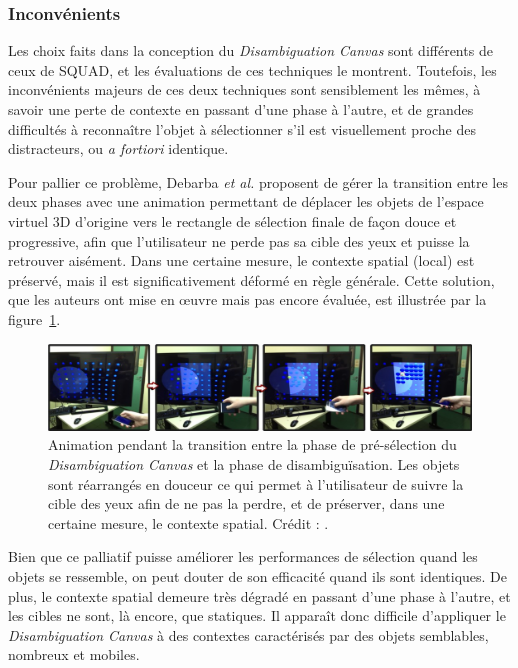 	\subsubsection{Inconvénients}
	Les choix faits dans la conception du \emph{Disambiguation Canvas} sont différents de ceux de SQUAD, et les évaluations de ces techniques le montrent. Toutefois, les inconvénients majeurs de ces deux techniques sont sensiblement les mêmes, à savoir une perte de contexte en passant d'une phase à l'autre, et de grandes difficultés à reconnaître l'objet à sélectionner s'il est visuellement proche des distracteurs, ou \emph{a fortiori} identique.
	
	Pour pallier ce problème, Debarba \emph{et al.} proposent de gérer la transition entre les deux phases avec une animation permettant de déplacer les objets de l'espace virtuel 3D d'origine vers le rectangle de sélection finale de façon \og douce \fg{} et progressive, afin que l'utilisateur ne perde pas sa cible des yeux et puisse la retrouver aisément. Dans une certaine mesure, le contexte spatial (local) est préservé, mais il est significativement déformé en règle générale. Cette solution, que les auteurs ont mise en \oe{}uvre mais pas encore évaluée, est illustrée par la figure~\ref{fig:dCanvasContext}.
	
	\begin{figure}[!htb]
		\centering
		\includegraphics[width=\textwidth]{figures/ch2/dCanvasContext}
		\caption[\emph{Disambiguation Canvas} -- animation de transition]{Animation pendant la transition entre la phase de pré-sélection du \emph{Disambiguation Canvas} et la phase de disambiguïsation. Les objets sont réarrangés \og en douceur \fg{} ce qui permet à l'utilisateur de suivre la cible des yeux afin de ne pas la perdre, et de préserver, dans une certaine mesure, le contexte spatial. Crédit : \cite{debarba2013disambiguation}.}
		\label{fig:dCanvasContext}
	\end{figure}
	
	Bien que ce palliatif puisse améliorer les performances de sélection quand les objets se ressemble, on peut douter de son efficacité quand ils sont identiques. De plus, le contexte spatial demeure très dégradé en passant d'une phase à l'autre, et les cibles ne sont, là encore, que statiques. Il apparaît donc difficile d'appliquer le \emph{Disambiguation Canvas} à des contextes caractérisés par des objets semblables, nombreux et mobiles.
	
